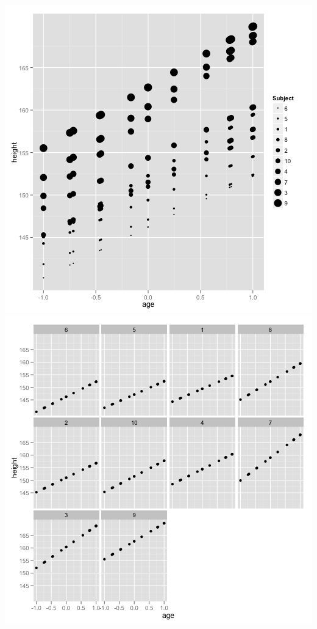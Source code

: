 \documentclass{article}
\makeatletter
\newenvironment{kframe}{%
 \def\FrameCommand##1{\hskip\@totalleftmargin \hskip-\fboxsep
 \colorbox{shadecolor}{##1}\hskip-\fboxsep
     \hskip-\linewidth \hskip-\@totalleftmargin \hskip\columnwidth}%
 \MakeFramed {\advance\hsize-\width
   \@totalleftmargin\z@ \linewidth\hsize
   \@setminipage}}%
 {\par\unskip\endMakeFramed}
\newenvironment{knitrout}{}{} %
\makeatother
\begin{document}
\begin{knitrout}
{\begin{kframe}
\centering{}\includegraphics{ox-simulate1} \includegraphics{ox-simulate2} 

\end{kframe}}
\end{knitrout}
\end{document}
